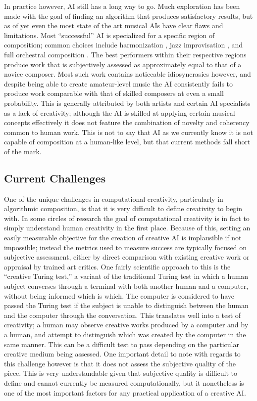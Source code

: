 \documentclass[ author={Stephen Livermore-Tozer},
				supervisor={Dr. Peter Flach},
				degree={MEng},
				title={Algorithmic Co-composition Using Machine Learning},
				subtitle={},
				type={research},
				year={2016} ]{dissertation}
\begin{document}
	In practice however, AI still has a long way to go. Much exploration has been made with the goal of finding an algorithm that produces satisfactory results, but as of yet even the most state of the art musical AIs have clear flaws and limitations. Most ``successful'' AI is specialized for a specific region of composition; common choices include harmonization \cite{freitas2011melody}, jazz improvisation \cite{franklin2001multi}, and full orchestral composition \cite{diaz2011composing}. The best performers within their respective regions produce work that is subjectively assessed as approximately equal to that of a novice composer. Most such work contains noticeable idiosyncrasies however, and despite being able to create amateur-level music the AI consistently fails to produce work comparable with that of skilled composers at even a small probability. This is generally attributed by both artists and certain AI specialists as a lack of creativity; although the AI is skilled at applying certain musical concepts effectively it does not feature the combination of novelty and coherency common to human work. This is not to say that AI as we currently know it is not capable of composition at a human-like level, but that current methods fall short of the mark.
	
	\subsection{Current Challenges}
	
	One of the unique challenges in computational creativity, particularly in algorithmic composition, is that it is very difficult to define creativity to begin with. In some circles of research the goal of computational creativity is in fact to simply understand human creativity in the first place. Because of this, setting an easily measurable objective for the creation of creative AI is implausible if not impossible; instead the metrics used to measure success are typically focused on subjective assessment, either by direct comparison with existing creative work or appraisal by trained art critics. One fairly scientific approach to this is the ``creative Turing test,'' a variant of the traditional Turing test in which a human subject converses through a terminal with both another human and a computer, without being informed which is which. The computer is considered to have passed the Turing test if the subject is unable to distinguish between the human and the computer through the conversation. This translates well into a test of creativity; a human may observe creative works produced by a computer and by a human, and attempt to distinguish which was created by the computer in the same manner. This can be a difficult test to pass depending on the particular creative medium being assessed. One important detail to note with regards to this challenge however is that it does not assess the subjective quality of the piece. This is very understandable given that subjective quality is difficult to define and cannot currently be measured computationally, but it nonetheless is one of the most important factors for any practical application of a creative AI.
	
\end{document}
